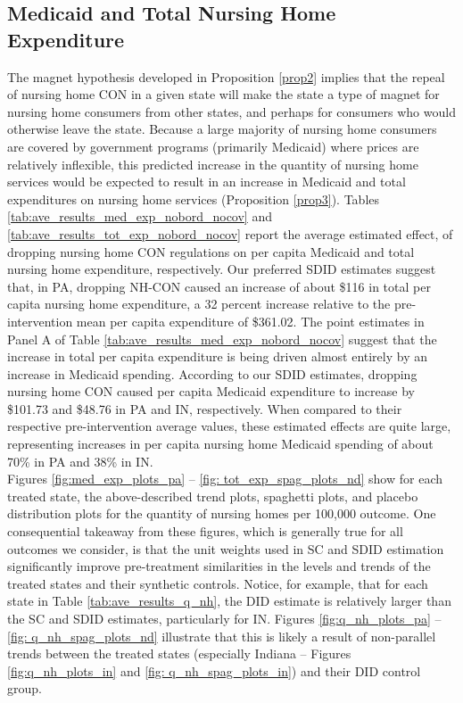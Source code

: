 \documentclass[../Main.tex]{subfiles}
\begin{document}
\subsection{Medicaid and Total Nursing Home Expenditure}

The magnet hypothesis developed in Proposition \ref{prop2} implies that the repeal of nursing home CON in a given state will make the state a type of magnet for nursing home consumers from other states, and perhaps for consumers who would otherwise leave the state. Because a large majority of nursing home consumers are covered by government programs (primarily Medicaid) where prices are relatively inflexible, this predicted increase in the quantity of nursing home services would be expected to result in an increase in Medicaid and total expenditures on nursing home services (Proposition \ref{prop3}). Tables \ref{tab:ave_results_med_exp_nobord_nocov} and \ref{tab:ave_results_tot_exp_nobord_nocov} report the average estimated effect, of dropping nursing home CON regulations on per capita Medicaid and total nursing home expenditure, respectively. Our preferred SDID estimates suggest that, in PA, dropping NH-CON caused an increase of about \$116 in total per capita nursing home expenditure, a 32 percent increase relative to the pre-intervention mean per capita expenditure of \$361.02. The point estimates in Panel A of Table \ref{tab:ave_results_med_exp_nobord_nocov} suggest that the increase in total per capita expenditure is being driven almost entirely by an increase in Medicaid spending. According to our SDID estimates, dropping nursing home CON caused per capita Medicaid expenditure to increase by \$101.73 and \$48.76 in PA and IN, respectively. When compared to their respective pre-intervention average values, these estimated effects are quite large, representing increases in per capita nursing home Medicaid spending of about 70\% in PA and 38\% in IN.\\
\indent Figures \ref{fig:med_exp_plots_pa} -- \ref{fig: tot_exp_spag_plots_nd} show for each treated state, the above-described trend plots, spaghetti plots, and placebo distribution plots for      the quantity of nursing homes per 100,000 outcome. One consequential takeaway from these figures, which is generally true for all outcomes we consider, is that the unit weights used in SC and SDID estimation significantly improve pre-treatment similarities in the levels and trends of the treated states and their synthetic controls. Notice, for example, that for each state in Table \ref{tab:ave_results_q_nh}, the DID estimate is relatively larger than the SC and SDID estimates, particularly for IN. Figures \ref{fig:q_nh_plots_pa} -- \ref{fig: q_nh_spag_plots_nd} illustrate that this is likely a result of non-parallel trends between the treated states (especially Indiana -- Figures \ref{fig:q_nh_plots_in} and \ref{fig: q_nh_spag_plots_in}) and their DID control group.\\
\end{document}
